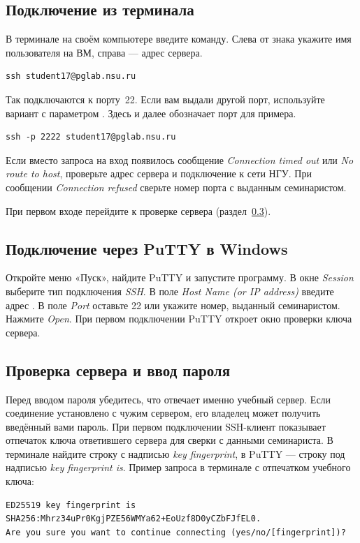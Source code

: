\subsection{Подключение из терминала}

В терминале на своём компьютере введите команду. Слева от знака
 укажите имя пользователя на ВМ, справа --- адрес сервера.
\begin{verbatim}
ssh student17@pglab.nsu.ru
\end{verbatim}
Так подключаются к порту~22. Если вам выдали другой порт, используйте
вариант с параметром . Здесь и далее  обозначает
порт для примера.
\begin{verbatim}
ssh -p 2222 student17@pglab.nsu.ru
\end{verbatim}
Если вместо запроса на вход появилось сообщение \emph{Connection timed out}
или \emph{No route to host}, проверьте адрес сервера и подключение к сети
НГУ. При сообщении \emph{Connection refused} сверьте номер порта с выданным
семинаристом.

При первом входе перейдите к проверке сервера (раздел~\ref{sec:host-key}).

\subsection{Подключение через PuTTY в Windows}
\label{sec:putty-login}

Откройте меню «Пуск», найдите PuTTY и запустите программу.
В окне \emph{Session} выберите тип подключения \emph{SSH}.
В поле \emph{Host Name (or IP address)} введите адрес
. В поле \emph{Port} оставьте 22 или укажите номер,
выданный семинаристом. Нажмите \emph{Open}. При первом подключении
PuTTY откроет окно проверки ключа сервера.

\subsection{Проверка сервера и ввод пароля}
\label{sec:host-key}

Перед вводом пароля убедитесь, что отвечает именно учебный сервер.
Если соединение установлено с чужим сервером, его владелец может получить
введённый вами пароль. При первом подключении SSH-клиент показывает
отпечаток ключа ответившего сервера для сверки с данными семинариста.
В терминале найдите строку с надписью \emph{key fingerprint}, в PuTTY ---
строку под надписью \emph{key fingerprint is}. Пример запроса в терминале
с отпечатком учебного ключа:
\begin{verbatim}
ED25519 key fingerprint is SHA256:Mhrz34uPr0KgjPZE56WMYa62+EoUzf8D0yCZbFJfEL0.
Are you sure you want to continue connecting (yes/no/[fingerprint])?
\end{verbatim}

